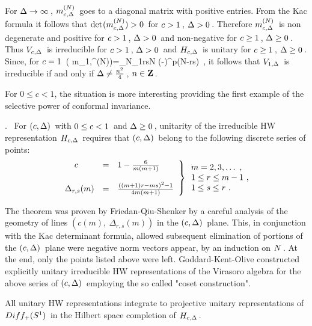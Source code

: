 For \s$\Delta\to\infty\hspace{0.05cm}$, \s\s$m_{c,\Delta}^{(N)}\hspace{0.05cm}$ goes
to a diagonal matrix with positive entries. From the Kac formula
it follows that \s$\det\hspace{0.025cm}( m_{c,\Delta}^{(N)})>0\hspace{0.05cm}$
for \s$c>1\hspace{0.05cm}$, \s$\Delta>0\hspace{0.05cm}$. Therefore \s$m_{c,\Delta}^{(N)}\hspace{0.05cm}$
is non degenerate and
positive for \s$c>1\hspace{0.05cm}$, \s$\Delta>0\hspace{0.05cm}$ and non-negative for
\s$c\geq 1\hspace{0.05cm}$, \s$\Delta\geq 0\hspace{0.05cm}$.
Thus \s$V_{c,\Delta}\hspace{0.05cm}$ is irreducible for \s$c>1\hspace{0.05cm}$,
\s$\Delta>0\hspace{0.05cm}$
and \s$H_{c,\Delta}\hspace{0.05cm}$ is unitary for \s$c \geq 1\hspace{0.05cm}$,
\s$\Delta\geq 0\hspace{0.05cm}$. \s Since, for \s$c=1\hspace{0.05cm}$
\qq
 \det\m( m_{1,\Delta}^{(N)})\s =\s \kappa_N\prod_{1\leq rs\leq N}
	  \left(\Delta-\right)^{p(N-rs)}\ ,
\non
\qqq
it follows that \s$V_{1,\Delta}\hspace{0.05cm}$ is irreducible if and only
if \s$\Delta\neq \frac{n^2}{4}\hspace{0.05cm}$,
\s$n\in{{\bf Z}}\hspace{0.05cm}$.
\vs 0.6cm

For $0\leq c< 1$, the
situation is more interesting providing the
first example of the selective power of conformal invariance.
\vs 0.4cm

. \ For \s$(c,\Delta)\hspace{0.05cm}$ with \s$0\leq c<1\hspace{0.05cm}$
and \s$\Delta\geq 0\hspace{0.05cm}$,
unitarity of the irreducible HW representation \s$H_{c,\Delta}\hspace{0.05cm}$
requires that \s$(c,\Delta)\hspace{0.05cm}$ belong to the following discrete
series of points:
\[ \left.
 \begin{array}{lcl}
 {\quad\hspace{0.05cm}c}         &=& 1-\frac{6}{m(m+1)}  \\
	   & &                     \\
 \Delta_{r,s}(m)&=&\frac{((m+1)r-ms)^2-1}{4m(m+1)}
 \end{array} \right\}
		   \begin{array}{l} m=2,3,\ldots\ , \\
				 1\leq r\leq m-1\ , \\
				 1\leq s\leq r\ .
		   \end{array}
\]

\vs 0.4cm


\no The theorem was proven by Friedan-Qiu-Shenker
by a careful analysis of the geometry of lines
$(c(m),\ \Delta_{r,s}(m))$ in the \s$(c,\Delta)\hspace{0.05cm}$ plane.
This, in conjunction with the Kac
determinant formula, allowed subsequent elimination
of portions of the \s$(c,\Delta)\hspace{0.05cm}$ plane were negative norm
vectors appear, by an induction on \s$N\hspace{0.05cm}$.
\s At the end, only the points listed above were left.
Goddard-Kent-Olive constructed explicitly unitary irreducible
HW representations of the Virasoro algebra
for the above series of \s$(c,\Delta)\hspace{0.05cm}$
employing the so called "coset construction".
\vs 0.4cm

All unitary HW representations integrate to
projective unitary representations of \s$Diff_+(S^1)\hspace{0.05cm}$
in the Hilbert space completion of \s$H_{c,\Delta}\hspace{0.05cm}$.
\vs 0.4cm


